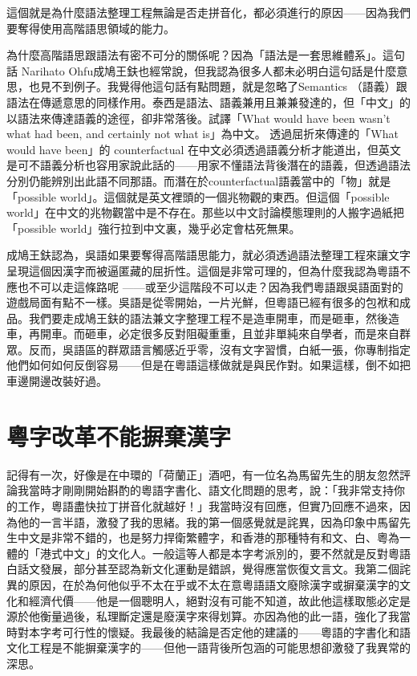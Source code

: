 \documentclass[a5paper, 10pt, openany]{book} %
\begin{document}
這個就是為什麼語法整理工程無論是否走拼音化，都必須進行的原因——因為我們要奪得使用高階語思領域的能力。

為什麼高階語思跟語法有密不可分的關係呢？因為「語法是一套思維體系」。這句話
Narihato Ohfu成鳩王鈇也經常說，但我認為很多人都未必明白這句話是什麼意思，也見不到例子。我覺得他這句話有點問題，就是忽略了Semantics （語義）跟語法在傳遞意思的同樣作用。泰西是語法、語義兼用且兼兼發達的，但「中文」的以語法來傳達語義的途徑，卻非常落後。試譯「What would have been wasn’t what had been, and certainly not what is」為中文。 透過屈折來傳達的「What would have been」的 counterfactual 在中文必須透過語義分析才能道出，但英文是可不語義分析也容用家說此話的——用家不懂語法背後潛在的語義，但透過語法分別仍能辨別出此語不同那語。而潛在於counterfactual語義當中的「物」就是「possible world」。這個就是英文裡頭的一個兆物觀的東西。但這個「possible world」在中文的兆物觀當中是不存在。那些以中文討論模態理則的人搬字過紙把「possible world」強行拉到中文裏，幾乎必定會枯死無果。

成鳩王鈇認為，吳語如果要奪得高階語思能力，就必須透過語法整理工程來讓文字呈現這個因漢字而被逼匿藏的屈折性。這個是非常可理的，但為什麼我認為粵語不應也不可以走這條路呢 ——或至少這階段不可以走？因為我們粵語跟吳語面對的遊戲局面有點不一樣。吳語是從零開始，一片光鮮，但粵語已經有很多的包袱和成品。我們要走成鳩王鈇的語法兼文字整理工程不是造車開車，而是砸車，然後造車，再開車。而砸車，必定很多反對阻礙重重，且並非單純來自學者，而是來自群眾。反而，吳語區的群眾語言觸感近乎零，沒有文字習慣，白紙一張，你專制指定他們如何如何反倒容易——但是在粵語這樣做就是與民作對。如果這樣，倒不如把車邊開邊改裝好過。

\section{粵字改革不能摒棄漢字}

記得有一次，好像是在中環的「荷蘭正」酒吧，有一位名為馬留先生的朋友忽然評論我當時才剛剛開始斟酌的粵語字書化、語文化問題的思考，說：「我非常支持你的工作，粵語盡快拉丁拼音化就越好！」我當時沒有回應，但實乃回應不過來，因為他的一言半語，激發了我的思緒。我的第一個感覺就是詫異，因為印象中馬留先生中文是非常不錯的，也是努力捍衛繁體字，和香港的那種特有和文、白、粵為一體的「港式中文」的文化人。一般這等人都是本字考派別的，要不然就是反對粵語白話文發展，部分甚至認為新文化運動是錯誤，覺得應當恢復文言文。我第二個詫異的原因，在於為何他似乎不太在乎或不太在意粵語語文廢除漢字或摒棄漢字的文化和經濟代價——他是一個聰明人，絕對沒有可能不知道，故此他這樣取態必定是源於他衡量過後，私理斷定還是廢漢字來得划算。亦因為他的此一語，強化了我當時對本字考可行性的懷疑。我最後的結論是否定他的建議的——粵語的字書化和語文化工程是不能摒棄漢字的——但他一語背後所包涵的可能思想卻激發了我異常的深思。
\end{document}
